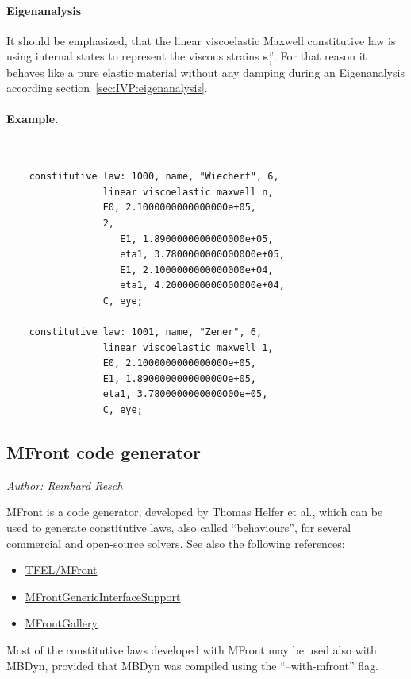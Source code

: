 \paragraph{Eigenanalysis}
It should be emphasized, that the linear viscoelastic Maxwell constitutive law is using internal states
to represent the viscous strains $\boldsymbol{\varepsilon}_i^v$.
For that reason it behaves like a pure elastic material without any damping
during an Eigenanalysis according section~\ref{sec:IVP:eigenanalysis}.
\paragraph{Example.} \
\begin{verbatim}
    constitutive law: 1000, name, "Wiechert", 6,
                 linear viscoelastic maxwell n,
                 E0, 2.1000000000000000e+05,
                 2,
                    E1, 1.8900000000000000e+05,
                    eta1, 3.7800000000000000e+05,
                    E1, 2.1000000000000000e+04,
                    eta1, 4.2000000000000000e+04,
                 C, eye;

    constitutive law: 1001, name, "Zener", 6,
                 linear viscoelastic maxwell 1,
                 E0, 2.1000000000000000e+05,
                 E1, 1.8900000000000000e+05,
                 eta1, 3.7800000000000000e+05,
                 C, eye;
\end{verbatim}

\subsection{MFront code generator}
\label{sec:CL:mfront}
\emph{Author: Reinhard Resch}

MFront is a code generator, developed by Thomas Helfer et al., which can be used to generate constitutive laws, also called ``behaviours'', for several commercial and open-source solvers\cite{helfer_introducing_2015}.
See also the following references:
\begin{itemize}
\item \href{https://thelfer.github.io/tfel/web/index.html}{TFEL/MFront}
\item \href{https://thelfer.github.io/mgis/web/index.html}{MFrontGenericInterfaceSupport}
\item \href{https://thelfer.github.io/MFrontGallery/web/index.html}{MFrontGallery}
\end{itemize}
Most of the constitutive laws developed with MFront may be used also with MBDyn, provided that MBDyn was compiled using the ``--with-mfront'' flag.
